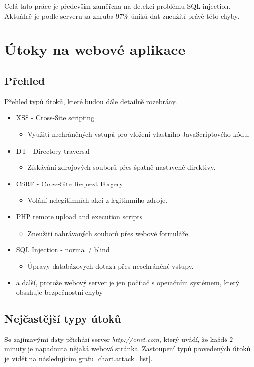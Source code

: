 \documentclass[12pt, a4paper]{report}
\begin{document}
Celá tato práce je především zaměřena na detekci problému SQL injection. Aktuálně je podle serveru  za zhruba 97\% úniků dat zneužití právě této chyby. 

\chapter{Útoky na webové aplikace}
\section{Přehled}
Přehled typů útoků, které budou dále detailně rozebrány.
\begin{itemize}
\item XSS - Cross-Site scripting
\begin{itemize}
\item Využití nechráněných vstupů pro vložení vlastního JavaScriptového kódu.
\end{itemize}
\item DT - Directory traversal
\begin{itemize}
\item Získávání zdrojových souborů přes špatně nastavené direktivy.
\end{itemize}
\item CSRF - Cross-Site Request Forgery 
\begin{itemize}
\item Volání nelegitimních akcí z legitimního zdroje.
\end{itemize}
\item PHP remote upload and execution scripts
\begin{itemize}
\item Zneužití nahrávaných souborů přes webové formuláře.
\end{itemize}
\item SQL Injection - normal / blind
\begin{itemize}
\item Úpravy databázových dotazů přes neochráněné vstupy.
\end{itemize}
\item a další, protože webový server je jen počítač s operačním systémem, který obsahuje bezpečnostní chyby
\end{itemize}

\section{Nejčastější typy útoků}
Se zajímavými daty přichází server \textit{http://cnet.com}, který uvádí, že každé 2 minuty je napadnuta nějaká webová stránka. Zastoupení typů provedených útoků je vidět na následujícím grafu \ref{chart.attack_list}.
\end{document}

